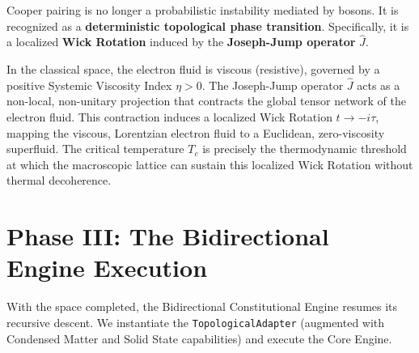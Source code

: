 \documentclass[11pt,openany]{extbook}
\theoremstyle{plain}
\theoremstyle{definition}
\begin{document}
Cooper pairing is no longer a probabilistic instability mediated by bosons. It is recognized as a \textbf{deterministic topological phase transition}. Specifically, it is a localized \textbf{Wick Rotation} induced by the \textbf{Joseph-Jump operator} $\hat{J}$.

In the classical space, the electron fluid is viscous (resistive), governed by a positive Systemic Viscosity Index $\eta > 0$. The Joseph-Jump operator $\hat{J}$ acts as a non-local, non-unitary projection that contracts the global tensor network of the electron fluid. This contraction induces a localized Wick Rotation $t \to -i\tau$, mapping the viscous, Lorentzian electron fluid to a Euclidean, zero-viscosity superfluid. The critical temperature $T_c$ is precisely the thermodynamic threshold at which the macroscopic lattice can sustain this localized Wick Rotation without thermal decoherence.

\section{Phase III: The Bidirectional Engine Execution}

With the space completed, the Bidirectional Constitutional Engine resumes its recursive descent. We instantiate the \texttt{TopologicalAdapter} (augmented with Condensed Matter and Solid State capabilities) and execute the Core Engine.
\end{document}
